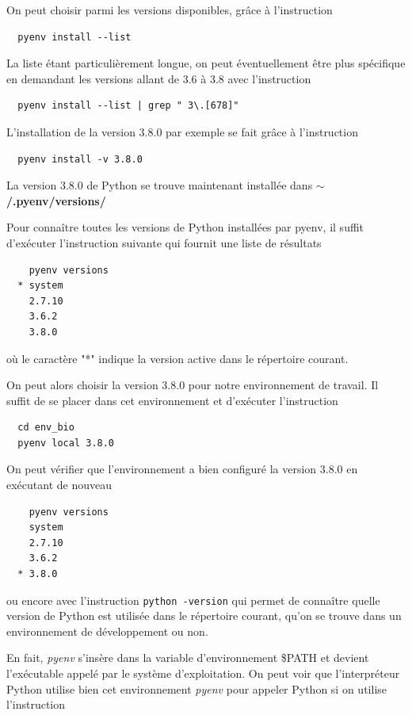\documentclass[twoside,a4paper,11pt,frenchb,openany]{report}
\begin{document}
On peut choisir parmi les versions disponibles, grâce à l'instruction
\begin{verbatim}  pyenv install --list\end{verbatim}
La liste étant particulièrement longue, on peut éventuellement être plus spécifique en demandant les versions allant de 3.6 à 3.8 avec l'instruction
\begin{verbatim}  pyenv install --list | grep " 3\.[678]"\end{verbatim}

L'installation de la version 3.8.0 par exemple se fait grâce à l'instruction
\begin{verbatim}  pyenv install -v 3.8.0\end{verbatim}

La version 3.8.0 de Python se trouve maintenant installée dans \textbf{$\sim$/.pyenv/versions/}

Pour connaître toutes les versions de Python installées par pyenv, il suffit d'exécuter l'instruction suivante qui fournit une liste de résultats
\begin{verbatim}    pyenv versions
  * system
    2.7.10
    3.6.2
    3.8.0\end{verbatim}
où le caractère "*" indique la version active dans le répertoire courant.

On peut alors choisir la version 3.8.0 pour notre environnement de travail. Il suffit de se placer dans cet environnement et d'exécuter l'instruction
\begin{verbatim}  cd env_bio
  pyenv local 3.8.0\end{verbatim}

On peut vérifier que l'environnement a bien configuré la version 3.8.0 en exécutant de nouveau

\begin{verbatim}    pyenv versions
    system
    2.7.10
    3.6.2
  * 3.8.0\end{verbatim}

ou encore avec l'instruction
\texttt{python \textemdash-version} qui
permet de connaître quelle version de Python est utilisée dans le répertoire courant, qu'on se trouve dans un environnement de développement ou non.

En fait, \textit{pyenv} s'insère dans la variable d'environnement \$PATH et devient l'exécutable appelé par le système d'exploitation. On peut voir que l'interpréteur Python utilise bien cet environnement \textit{pyenv} pour appeler Python si on utilise l'instruction
\end{document}
